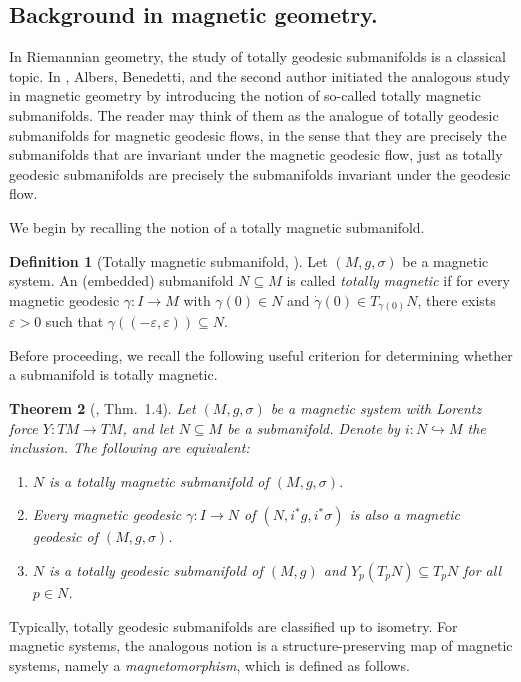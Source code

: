 \documentclass[11pt,reqno]{amsart}
\theoremstyle{plain}
\newtheorem{thm}{Theorem}[section]
\theoremstyle{definition}
\newtheorem{defn}[thm]{Definition}
\numberwithin{equation}{section}
\begin{document}
\subsection{Background in magnetic geometry.}
In Riemannian geometry, the study of totally geodesic submanifolds is a classical topic. In \cite{ABM}, Albers, Benedetti, and the second author initiated the analogous study in magnetic geometry by introducing the notion of so-called totally magnetic submanifolds. The reader may think of them as the analogue of totally geodesic submanifolds for magnetic geodesic flows, in the sense that they are precisely the submanifolds that are invariant under the magnetic geodesic flow, just as totally geodesic submanifolds are precisely the submanifolds invariant under the geodesic flow. 

We begin by recalling the notion of a totally magnetic submanifold.

\begin{defn}[{Totally magnetic submanifold, \cite[Def. 6.5]{ABM}}]
\label{defn: totally magnetic submfds}
Let $(M,g,\sigma)$ be a magnetic system. An (embedded) submanifold $N \subseteq M$ is called \textit{totally magnetic} if for every magnetic geodesic $\gamma : I \to M$ with $\gamma(0) \in N$ and $\dot{\gamma}(0) \in T_{\gamma(0)}N$, there exists $\varepsilon > 0$ such that $\gamma((-\varepsilon,\varepsilon)) \subseteq N$.
\end{defn}
Before proceeding, we recall the following useful criterion for determining whether a submanifold is totally magnetic.
\begin{thm}[\cite{ABM}, Thm.~1.4]
\label{t:totally_magnetic_submanifolds_characterization_ABM}
Let $(M,g,\sigma)$ be a magnetic system with Lorentz force $Y \colon TM \to TM$, and let $N \subseteq M$ be a submanifold. Denote by $i \colon N \hookrightarrow M$ the inclusion.
The following are equivalent:
\begin{enumerate}[label=(\roman*)]
    \item $N$ is a totally magnetic submanifold of $(M,g,\sigma)$.
    \item Every magnetic geodesic $\gamma \colon I \to N$ of $(N, i^*g, i^*\sigma)$ is also a magnetic geodesic of $(M,g,\sigma)$.
    \item $N$ is a totally geodesic submanifold of $(M,g)$ and $Y_p(T_pN) \subseteq T_pN$ for all $p \in N$.
\end{enumerate}
\end{thm}

Typically, totally geodesic submanifolds are classified up to isometry. For magnetic systems, the analogous notion is a structure-preserving map of magnetic systems, namely a \emph{magnetomorphism}, which is defined as follows.
\end{document}
